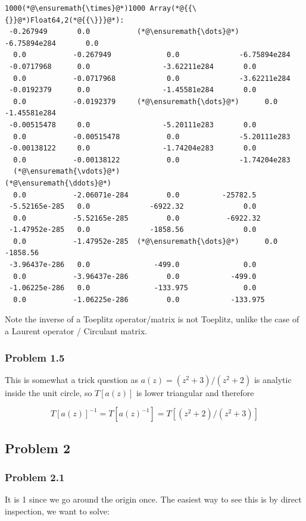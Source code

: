 \documentclass[12pt,a4paper]{article}
\begin{document}
\begin{lstlisting}
1000(*@\ensuremath{\times}@*)1000 Array(*@{{\{}}@*)Float64,2(*@{{\}}}@*):
 -0.267949       0.0           (*@\ensuremath{\dots}@*)     -6.75894e284       0.0
  0.0           -0.267949             0.0              -6.75894e284
 -0.0717968      0.0                 -3.62211e284       0.0
  0.0           -0.0717968            0.0              -3.62211e284
 -0.0192379      0.0                 -1.45581e284       0.0
  0.0           -0.0192379     (*@\ensuremath{\dots}@*)      0.0              -1.45581e284
 -0.00515478     0.0                 -5.20111e283       0.0
  0.0           -0.00515478           0.0              -5.20111e283
 -0.00138122     0.0                 -1.74204e283       0.0
  0.0           -0.00138122           0.0              -1.74204e283
  (*@\ensuremath{\vdots}@*)                            (*@\ensuremath{\ddots}@*)                   
  0.0           -2.06071e-284         0.0          -25782.5
 -5.52165e-285   0.0              -6922.32              0.0
  0.0           -5.52165e-285         0.0           -6922.32
 -1.47952e-285   0.0              -1858.56              0.0
  0.0           -1.47952e-285  (*@\ensuremath{\dots}@*)      0.0           -1858.56
 -3.96437e-286   0.0               -499.0               0.0
  0.0           -3.96437e-286         0.0            -499.0
 -1.06225e-286   0.0               -133.975             0.0
  0.0           -1.06225e-286         0.0            -133.975
\end{lstlisting}


Note the inverse of a Toeplitz operator/matrix is not Toeplitz, unlike the case of a Laurent operator / Circulant matrix.

\subsubsection{Problem 1.5}
This is somewhat a trick question as $a(z) = (z^2 + 3)/ (z^2 + 2)$ is analytic  inside the unit circle, so $T[a(z)]$ is lower triangular and  therefore

\[
T[a(z)]^{-1} = T[a(z)^{-1}] = T[(z^2 + 2)/(z^2+3)]
\]
\subsection{Problem 2}
\subsubsection{Problem 2.1}
It is 1 since we go around the origin once. The easiest way to see this is by direct inspection, we want to solve:
\end{document}
